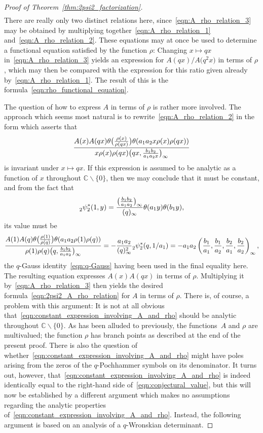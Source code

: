 \documentclass[pdftex]{sigma}
\numberwithin{equation}{section}
\newcommand{\C}{\mathbb{C}}
\begin{document}
\begin{proof}[Proof of Theorem~\ref{thm:2psi2_factorization}]
\begin{gather}
\end{gather}
There are really only two distinct relations here, since~\eqref{eqn:A_rho_relation_3} may be obtained by multiplying together~\eqref{eqn:A_rho_relation_1} and~\eqref{eqn:A_rho_relation_2}. These equations may at once be used to determine a functional equation satisfied by the function $\rho$: Changing $x \mapsto qx$ in~\eqref{eqn:A_rho_relation_3} yields an expression for $A(qx)/A\bigl(q^2x\bigr)$ in terms of $\rho$, which may then be compared with the expression for this ratio given already by~\eqref{eqn:A_rho_relation_1}. The result of this is the formula~\eqref{eqn:rho_functional_equation}.

The question of how to express $A$ in terms of $\rho$ is rather more involved. The approach which seems most natural is to rewrite~\eqref{eqn:A_rho_relation_2} in the form which asserts that
\begin{equation} \label{eqn:constant_expression_involving_A_and_rho}
{A(x) A(qx) \theta\bigl({\rho(x) \over \rho(qx)}\bigr) \theta (a_1a_2x\rho(x)\rho(qx) ) \over x\rho(x)\rho(qx) \bigl(qx,{b_1b_2 \over a_1a_2x}\bigr)_\infty}
\end{equation}
is invariant under $x \mapsto qx$. If this expression is assumed to be analytic as a function of $x$ throughout $\C \backslash \{0\}$, then we may conclude that it must be constant, and from the fact that
\[ {}_2^{}\psi_2^\ast(1,y) = {\bigl({b_1b_2 \over a_1a_2}\bigr)_\infty \over (q)_\infty} \theta(a_1y)\theta(b_1y), \]
its value must be
\begin{equation} \label{eqn:conjectural_value}
{A(1) A(q) \theta\bigl({\rho(1) \over \rho(q)}\bigr) \theta(a_1a_2\rho(1)\rho(q)) \over \rho(1)\rho(q) \bigl(q,{b_1b_2 \over a_1a_2}\bigr)_\infty} = -{a_1a_2 \over (q)_\infty^2} {}_2^{}\psi_2^\ast(q,1/a_1) = -a_1a_2\left({b_1 \over a_1},{b_1 \over a_2},{b_2 \over a_1},{b_2 \over a_2}\right)_{ \infty},
\end{equation}
the $q$-Gauss identity~\eqref{eqn:q-Gauss} having been used in the final equality here. The resulting equation expresses $A(x)A(qx)$ in terms of $\rho$. Multiplying it by~\eqref{eqn:A_rho_relation_3} then yields the desired formula~\eqref{eqn:2psi2_A_rho_relation} for $A$ in terms of $\rho$. There is, of course, a problem with this argument: It is not at all obvious that~\eqref{eqn:constant_expression_involving_A_and_rho} should be analytic throughout $\C \backslash \{0\}$. As has been alluded to previously, the functions~$A$ and $\rho$ are multivalued; the function $\rho$ has branch points as described at the end of the present proof. There is also the question of whether~\eqref{eqn:constant_expression_involving_A_and_rho} might have poles arising from the zeros of the $q$-Pochhammer symbols on its denominator. It turns out, however, that~\eqref{eqn:constant_expression_involving_A_and_rho} is indeed identically equal to the right-hand side of~\eqref{eqn:conjectural_value}, but this will now be established by a different argument which makes no assumptions regarding the analytic properties of~\eqref{eqn:constant_expression_involving_A_and_rho}. Instead, the following argument is based on an analysis of a $q$-Wronskian determinant.


\end{proof}
\end{document}

